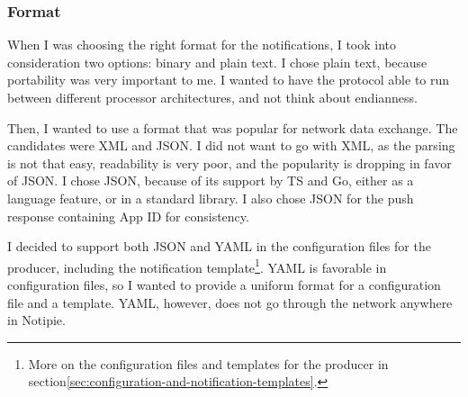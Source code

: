 \subsubsection{Format}\label{sec:protocol-format}

When I was choosing the right format
for the notifications,
I took into consideration two options:
binary and plain text.
I chose plain text,
because portability was very important to me.
I wanted to have the protocol able to run
between different processor architectures,
and not think about endianness.

Then, I wanted to use a format
that was popular for network data exchange.
The candidates were \ac{XML} and \ac{JSON}.
I did not want to go with \ac{XML},
as the parsing is not that easy,
readability is very poor,
and the popularity is dropping
in favor of \ac{JSON}.
I chose \ac{JSON},
because of its support by \acf{TS} and Go,
either as a language feature,
or in a standard library.
I also chose \ac{JSON} for the push response
containing App \ac{ID}
for consistency.

I decided to support both \ac{JSON} and \ac{YAML}
in the configuration files for the producer,
including the notification template\footnote{
  More on the configuration files and templates
  for the producer
  in section\ref{sec:configuration-and-notification-templates}.
}.
\ac{YAML} is favorable in configuration files,
so I wanted to provide a uniform
format for a configuration file
and a template.
\ac{YAML}, however,
does not go through the network
anywhere in Notipie.
